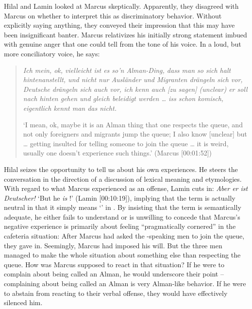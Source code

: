 \documentclass[output=paper,colorlinks,citecolor=brown]{langscibook}
\begin{document}
Hilal and Lamin looked at Marcus skeptically. Apparently, they disagreed with Marcus on whether to interpret this as discriminatory behavior. Without explicitly saying anything, they conveyed their impression that this may have been insignificant banter. Marcus relativizes his initially strong statement imbued with genuine anger that one could tell from the tone of his voice. In a loud, but more conciliatory voice, he says: 
\begin{quote}
\textit{Ich mein, ok, vielleicht ist es so'n Alman-Ding, dass man so sich halt hintenanstellt, und nicht nur Ausländer und Migranten drängeln sich vor, Deutsche drängeln sich auch vor, ich kenn auch \textnormal{[\textit{zu sagen}] (unclear)} er soll nach hinten gehen und gleich beleidigt werden … iss schon komisch, eigentlich kennt man das nicht.}

`I mean, ok, maybe it is an Alman thing that one respects the queue, and not only foreigners and migrants jump the queue; I also know [unclear] but … getting insulted for telling someone to join the queue … it is weird, usually one doesn't experience such things.' (Marcus [00:01:52])
\end{quote}

Hilal seizes the opportunity to tell us about his own experiences. He steers the conversation in the direction of a discussion of lexical meaning and etymologies. With regard to what Marcus experienced as an offense, Lamin cuts in: \textit{Aber er ist Deutscher!} `But he \textit{is} !' (Lamin [00:10:19]), implying that the term is actually neutral in that it simply means `' in . By insisting that the term is semantically adequate, he either fails to understand or is unwilling to concede that Marcus's negative experience is primarily about feeling ``pragmatically cornered'' in the cafeteria situation: After Marcus had asked the -speaking men to join the queue, they gave in. Seemingly, Marcus had imposed his will. But the three men managed to make the whole situation about something else than respecting the queue. How was Marcus supposed to react in that situation? If he were to complain about being called an Alman, he would underscore their point -- complaining about being called an Alman is very Alman-like behavior. If he were to abstain from reacting to their verbal offense, they would have effectively silenced him. 
\end{document}
